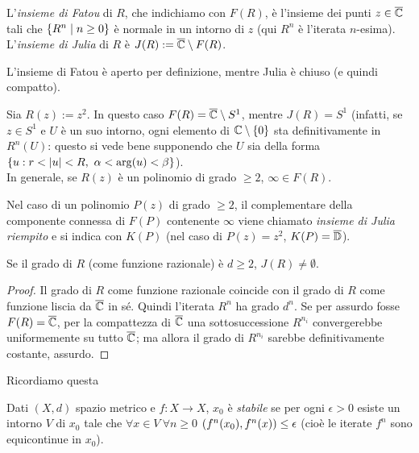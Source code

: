 \begin{defi}L'\emph{insieme di Fatou} di $R$, che indichiamo con $F(R)$, è
l'insieme dei punti $z\in\overline{\mathbb{C}}$ tali che $\left\{R^n\mid n\ge 0\right\}$ è normale in un intorno di $z$
(qui $R^n$ è l'iterata $n$-esima). L'\emph{insieme di Julia} di $R$ è $J(R):=\overline{\mathbb{C}}\setminus F(R)$.
\end{defi}

\begin{oss}L'insieme di Fatou è aperto per definizione, mentre Julia è chiuso (e quindi compatto).
\end{oss}

\begin{esempio}Sia $R(z):=z^2$. In questo caso $F(R)=\overline{\mathbb{C}}\setminus S^1$, mentre $J(R)=S^1$
(infatti, se $z\in S^1$ e $U$ è un suo intorno, ogni elemento di $\mathbb{C}\setminus\left\{0\right\}$ sta definitivamente in $R^n(U)$:
questo si vede bene supponendo che $U$ sia della forma $\set{u:r<\abs{u}<R,\ \alpha<\arg(u)<\beta}$). \\
In generale, se $R(z)$ è un polinomio di grado $\ge 2$, $\infty\in F(R)$.
\end{esempio}

Nel caso di un polinomio $P(z)$ di grado $\ge 2$, il complementare della componente connessa di $F(P)$ contenente $\infty$
viene chiamato \emph{insieme di Julia riempito} e si indica con $K(P)$ (nel caso di $P(z)=z^2$, $K(P)=\overline{\mathbb{D}}$).

\begin{prop}Se il grado di $R$ (come funzione razionale) è $d\ge 2$, $J(R)\neq\emptyset$.
\end{prop}

\begin{proof}Il grado di $R$ come funzione razionale coincide con il grado di $R$ come funzione liscia da $\overline{\mathbb{C}}$ in sé.
Quindi l'iterata $R^n$ ha grado $d^n$. Se per assurdo fosse $F(R)=\overline{\mathbb{C}}$, per la compattezza di $\overline{\mathbb{C}}$
una sottosuccessione $R^{n_i}$ convergerebbe uniformemente su tutto $\overline{\mathbb{C}}$; ma allora il grado
di $R^{n_i}$ sarebbe definitivamente costante, assurdo.
\end{proof}

Ricordiamo questa

\begin{defi}Dati $(X,d)$ spazio metrico e $f:X\to X$, $x_0$ è \emph{stabile}
se per ogni $\epsilon>0$ esiste un intorno $V$ di $x_0$ tale che $\forall x\in V\ \forall n\ge 0$
$\left(f^n(x_0),f^n(x)\right)\le\epsilon$ (cioè le iterate $f^n$ sono equicontinue in $x_0$).
\end{defi}

